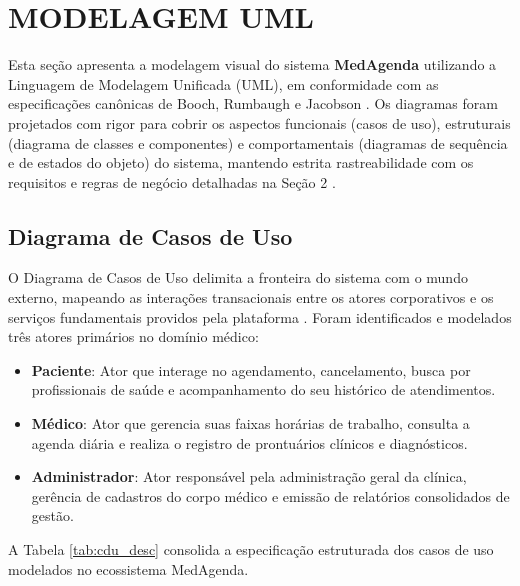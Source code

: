 \section{MODELAGEM UML}

Esta seção apresenta a modelagem visual do sistema \textbf{MedAgenda} utilizando a Linguagem de Modelagem Unificada (UML), em conformidade com as especificações canônicas de Booch, Rumbaugh e Jacobson \cite{booch2005}. Os diagramas foram projetados com rigor para cobrir os aspectos funcionais (casos de uso), estruturais (diagrama de classes e componentes) e comportamentais (diagramas de sequência e de estados do objeto) do sistema, mantendo estrita rastreabilidade com os requisitos e regras de negócio detalhadas na Seção 2 \cite{larman2004}.

\subsection{Diagrama de Casos de Uso}

O Diagrama de Casos de Uso delimita a fronteira do sistema com o mundo externo, mapeando as interações transacionais entre os atores corporativos e os serviços fundamentais providos pela plataforma \cite{booch2005}. Foram identificados e modelados três atores primários no domínio médico:
\begin{itemize}
    \item \textbf{Paciente}: Ator que interage no agendamento, cancelamento, busca por profissionais de saúde e acompanhamento do seu histórico de atendimentos.
    \item \textbf{Médico}: Ator que gerencia suas faixas horárias de trabalho, consulta a agenda diária e realiza o registro de prontuários clínicos e diagnósticos.
    \item \textbf{Administrador}: Ator responsável pela administração geral da clínica, gerência de cadastros do corpo médico e emissão de relatórios consolidados de gestão.
\end{itemize}

A Tabela \ref{tab:cdu_desc} consolida a especificação estruturada dos casos de uso modelados no ecossistema MedAgenda.

